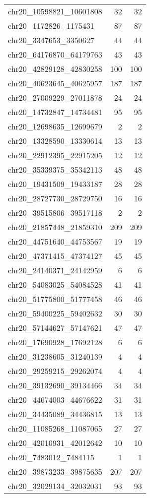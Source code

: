 \begin{longtable}{lrr}
chr20_10598821_10601808 & 32 & 32 \\
chr20_1172826_1175431 & 87 & 87 \\
chr20_3347653_3350627 & 44 & 44 \\
chr20_64176870_64179763 & 43 & 43 \\
chr20_42829128_42830258 & 100 & 100 \\
chr20_40623645_40625957 & 187 & 187 \\
chr20_27009229_27011878 & 24 & 24 \\
chr20_14732847_14734481 & 95 & 95 \\
chr20_12698635_12699679 & 2 & 2 \\
chr20_13328590_13330614 & 13 & 13 \\
chr20_22912395_22915205 & 12 & 12 \\
chr20_35339375_35342113 & 48 & 48 \\
chr20_19431509_19433187 & 28 & 28 \\
chr20_28727730_28729750 & 16 & 16 \\
chr20_39515806_39517118 & 2 & 2 \\
chr20_21857448_21859310 & 209 & 209 \\
chr20_44751640_44753567 & 19 & 19 \\
chr20_47371415_47374127 & 45 & 45 \\
chr20_24140371_24142959 & 6 & 6 \\
chr20_54083025_54084528 & 41 & 41 \\
chr20_51775800_51777458 & 46 & 46 \\
chr20_59400225_59402632 & 30 & 30 \\
chr20_57144627_57147621 & 47 & 47 \\
chr20_17690928_17692128 & 6 & 6 \\
chr20_31238605_31240139 & 4 & 4 \\
chr20_29259215_29262074 & 4 & 4 \\
chr20_39132690_39134466 & 34 & 34 \\
chr20_44674003_44676622 & 31 & 31 \\
chr20_34435089_34436815 & 13 & 13 \\
chr20_11085268_11087065 & 27 & 27 \\
chr20_42010931_42012642 & 10 & 10 \\
chr20_7483012_7484115 & 1 & 1 \\
chr20_39873233_39875635 & 207 & 207 \\
chr20_32029134_32032031 & 93 & 93 \\

\end{longtable}

